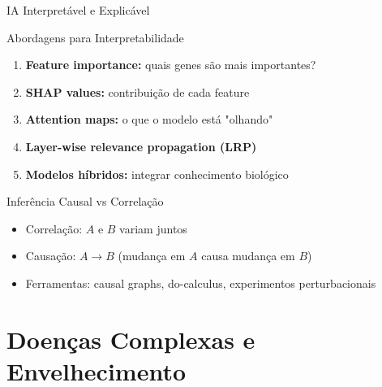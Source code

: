 \begin{frame}{IA Interpretável e Explicável}

\vspace{0.3cm}

\begin{block}{Abordagens para Interpretabilidade}
\begin{enumerate}
    \item \textbf{Feature importance:} quais genes são mais importantes?
    \item \textbf{SHAP values:} contribuição de cada feature
    \item \textbf{Attention maps:} o que o modelo está "olhando"
    \item \textbf{Layer-wise relevance propagation (LRP)}
    \item \textbf{Modelos híbridos:} integrar conhecimento biológico
\end{enumerate}
\end{block}

\vspace{0.3cm}

\begin{exampleblock}{Inferência Causal vs Correlação}
\begin{itemize}
    \item Correlação: $A$ e $B$ variam juntos
    \item Causação: $A \rightarrow B$ (mudança em $A$ causa mudança em $B$)
    \item Ferramentas: causal graphs, do-calculus, experimentos perturbacionais
\end{itemize}
\end{exampleblock}
\end{frame}

\section{Doenças Complexas e Envelhecimento}

